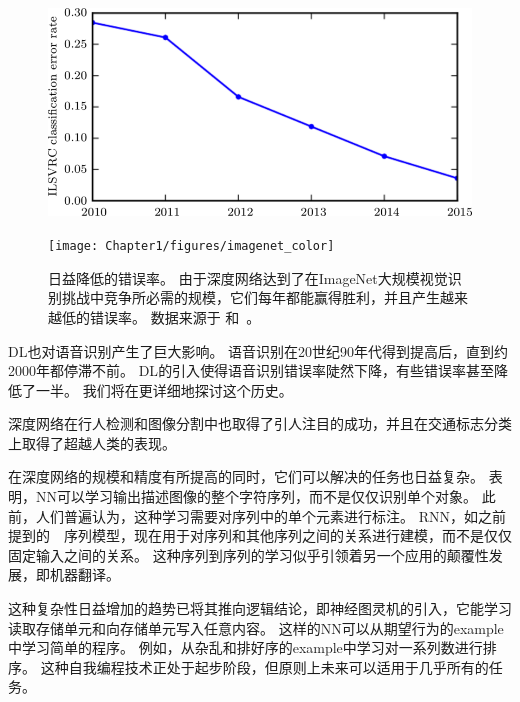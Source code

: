 \begin{figure}[!htb]
\ifOpenSource
\centerline{\includegraphics[scale=0.5]{images/12.png}}
\else
\centerline{\texttt{[image: Chapter1/figures/imagenet\_color]}}
\fi
\caption{日益降低的错误率。
由于深度网络达到了在ImageNet大规模视觉识别挑战中竞争所必需的规模，它们每年都能赢得胜利，并且产生越来越低的错误率。
数据来源于 \citet{Russakovsky2014imagenet}和~\citet{He-et-al-arxiv2015}。}
\label{fig:chap1_imagenet_color}
\end{figure}


\gls{DL}也对语音识别产生了巨大影响。
语音识别在20世纪90年代得到提高后，直到约2000年都停滞不前。
\gls{DL}的引入\citep{dahl2010phonerec,Deng-2010,Seide2011,Hinton-et-al-arxiv2012}使得语音识别错误率陡然下降，有些错误率甚至降低了一半。
我们将在更详细地探讨这个历史。

深度网络在行人检测和图像分割中也取得了引人注目的成功\citep{sermanet-cvpr-13,Farabet-et-al-2013,couprie-iclr-13}，并且在交通标志分类上取得了超越人类的表现\citep{Ciresan-et-al-2012}。

在深度网络的规模和精度有所提高的同时，它们可以解决的任务也日益复杂。
\citet{Goodfellow+et+al-ICLR2014a}表明，\gls{NN}可以学习输出描述图像的整个字符序列，而不是仅仅识别单个对象。
此前，人们普遍认为，这种学习需要对序列中的单个元素进行标注\citep{gulcehre_knowledge_2016}。
\gls{RNN}，如之前提到的~~序列模型，现在用于对序列和其他序列之间的关系进行建模，而不是仅仅固定输入之间的关系。
这种序列到序列的学习似乎引领着另一个应用的颠覆性发展，即机器翻译\citep{Sutskever-et-al-NIPS2014,Bahdanau-et-al-ICLR2015-small}。


这种复杂性日益增加的趋势已将其推向逻辑结论，即神经图灵机\citep{Graves-et-al-arxiv2014}的引入，它能学习读取存储单元和向存储单元写入任意内容。
这样的\gls{NN}可以从期望行为的\gls{example}中学习简单的程序。
例如，从杂乱和排好序的\gls{example}中学习对一系列数进行排序。
这种自我编程技术正处于起步阶段，但原则上未来可以适用于几乎所有的任务。


